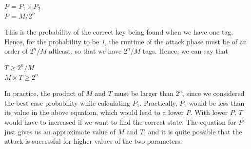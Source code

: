 \begin{center}
\large{$P$ = $P_1 \times P_2$}\\
\large{$P$ = $M/2^{n}$}\\
\end{center}

This is the probability of the correct key being found when we have one tag. Hence, for the probability to be \emph{1}, the runtime of the attack phase must be of an order of $2^{n}/M$ altleast, so that we have $2^{n}/M$ tags. Hence, we can say that

\begin{center}
\large{$T \geq 2^{n}/M$}\\
\large{$M \times T \geq 2^{n}$}
\end{center}

In practice, the product of $M$ and $T$ must be larger than $2^n$, since we considered the best case probability while calculating $P_1$. Practically, $P_1$ would be less than its value in the above equation, which would lead to a lower $P$. With lower $P$, $T$ would have to increased if we want to find the correct state. The equation for $P$ just gives us an approximate value of $M$ and $T$, and it is quite possible that the attack is successful for higher values of the two parameters.